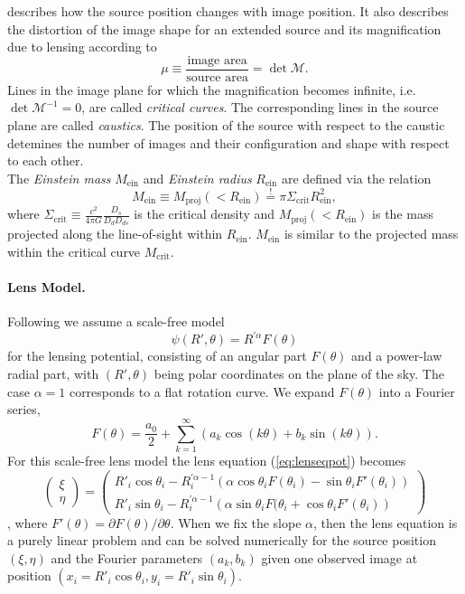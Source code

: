 describes how the source position changes with image position. It also describes the distortion of the image shape for an extended source and its magnification due to lensing according to
$$\mu \equiv \frac{\text{image area}}{\text{source area}} = \det \mathscr{M}.$$
Lines in the image plane for which the magnification becomes infinite, i.e. $\det \mathscr{M}^{-1} = 0$, are called \emph{critical curves}. The corresponding lines in the source plane are called \emph{caustics}. The position of the source with respect to the caustic detemines the number of images and their configuration and shape with respect to each other.
\\The \emph{Einstein mass} $M_\text{ein}$ and \emph{Einstein radius} $R_\text{ein}$ are defined via the relation
\begin{equation*}
M_\text{ein} \equiv M_\text{proj}(<R_\text{ein}) \overset{!}{=} \pi \Sigma_\text{crit} R_\text{ein}^2,
\end{equation*}
where $\Sigma_\text{crit} \equiv \frac{c^2}{4\pi G} \frac{D_s}{D_d D_{ds}}$ is the critical density and $M_\text{proj}(<R_\text{ein})$ is the mass projected along the line-of-sight within $R_\text{ein}$. $M_\text{ein}$ is similar to the projected mass within the critical curve $M_\text{crit}$.

\paragraph{Lens Model.} Following \citet{EvansWitt} we assume a scale-free model
\begin{equation*}
\psi(R',\theta) = R^{'\alpha} F(\theta) \label{eq:scalefreemodel}
\end{equation*}
for the lensing potential, consisting of an angular part $F(\theta)$ and a power-law radial part, with $(R',\theta)$ being polar coordinates on the plane of the sky. The case $\alpha = 1$ corresponds to a flat rotation curve. We expand $F(\theta)$ into a Fourier series,
\begin{equation}
F(\theta) = \frac{a_0}{2} + \sum_{k=1}^{\infty} \left(a_k \cos(k\theta) + b_k \sin (k\theta) \right). \label{eq:Fourieransatz}
\end{equation}
For this scale-free lens model the lens equation (\ref{eq:lenseqpot}) becomes
\begin{equation}
\begin{pmatrix} \xi \\ \eta \end{pmatrix} = \begin{pmatrix} R'_i \cos \theta_i - R_i^{'\alpha-1} \left(\alpha \cos \theta_i F(\theta_i) - \sin \theta_i F'(\theta_i) \right) \\ R'_i \sin \theta_i - R_i^{'\alpha-1} \left(\alpha \sin \theta_i F(\theta_i + \cos \theta_i F'(\theta_i) \right)\end{pmatrix}\label{eq:Fourierlenseq}
\end{equation}
\citep{EvansWitt}, where $F'(\theta) = \partial F(\theta) / \partial \theta$. When we fix the slope $\alpha$, then the lens equation is a purely linear problem and can be solved numerically for the source position $(\xi,\eta)$ and the Fourier parameters $(a_k,b_k)$ given one observed image at position $(x_i=R'_i \cos \theta_i,y_i=R'_i \sin \theta_i)$. 
